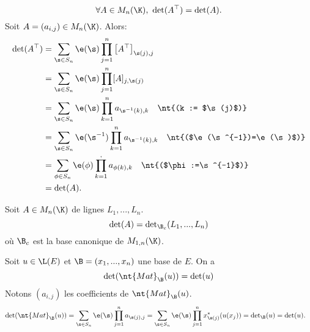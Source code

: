 \documentclass[11pt]{article}
\begin{document}
\begin{thm}{}{}
    \begin{equation*}
        \forall A \in M_n(\K), ~ \det(A^\top)=\det(A).
    \end{equation*}
    \tcblower
    Soit $A=(a_{i,j})\in M_n(\K)$. Alors:
    \begin{align*}
        \det(A^\top) &= \sum_{\s\in S_n}\e(\s)\prod_{j=1}^n\left[A^\top\right]_{\s(j),j}\\
        &= \sum_{\s\in S_n}\e(\s)\prod_{j=1}^n[A]_{j,\s(j)}\\
        &= \sum_{\s\in S_n}\e(\s)\prod_{k=1}^na_{\s^{-1}(k),k} \quad \nt{(k := $\s(j)$)}\\
        &= \sum_{\s\in S_n}\e(\s^{-1})\prod_{k=1}^na_{\s^{-1}(k),k} \quad \nt{($\e(\s^{-1})=\e(\s)$)}\\
        &= \sum_{\phi \in S_n}\e(\phi)\prod_{k=1}^,a_{\phi(k),k} \quad \nt{($\phi:=\s^{-1}$)}\\
        &= \det(A).
    \end{align*}

\end{thm}

\begin{corr}{}{}
    Soit $A\in M_n(\K)$ de lignes $L_1,...,L_n$.
    \begin{equation*}
        \det(A)=\det\nolimits_{\B_c}(L_1,...,L_n)
    \end{equation*}
    où $\B_c$ est la base canonique de $M_{1,n}(\K)$.
\end{corr}

\pagebreak

\begin{prop}{}{}
    Soit $u\in\L(E)$ et $\B=(x_1,...,x_n)$ une base de $E$. On a
    \begin{equation*}
        \det(\nt{Mat}_\B(u))=\det(u)
    \end{equation*}
    \tcblower
    Notons $(a_{i,j})$ les coefficients de $\nt{Mat}_\B(u)$.
    \begin{align*}
        \det(\nt{Mat}_\B(u))&=\sum_{\s\in S_n}\e(\s)\prod_{j=1}^na_{\s(j),j}=\sum_{\s\in S_n}\e(\s)\prod_{j=1}^nx^*_{\s(j)}(u(x_j))=\det\nolimits_\B(u)=\det(u).
    \end{align*}
\end{prop}
\end{document}
